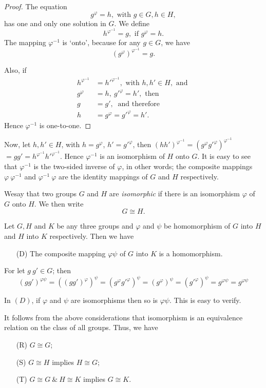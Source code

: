 \begin{proof}
  The equation
  $$
  g^\varphi = h, \text{ with } g \in  G, h \in  H,
  $$
  has one and only one solution in $G$. We define
  $$
  h^{\varphi^{-1}} = g, \text{ if } g^\varphi = h.
  $$
  The mapping $\varphi^{-1}$ is `onto', because for any $g \in 
  G$, we have  
  $$
  (g^\varphi)^{\varphi^{-1}} = g.
  $$

  Also, if
  \begin{align*}
    h^{\varphi^{-1}} & = h'^{\varphi^{-1}}, \text{ with } h, h'
    \in  H, \text{ and }\\ 
    g^\varphi & = h, ~ g'^\varphi = h', \text{ then } \\
    g & = g', ~\text{ and therefore } \\
    h & = g^\varphi = g'^\varphi = h'.
  \end{align*}
  Hence $\varphi^{-1}$ is one-to-one.
\end{proof}

Now, let $h, h' \in  H$, with $h = g^\varphi$, $h' =
g{'}^{\varphi}$, then $(hh')^{\varphi^{-1}} = (g^\varphi
g{'}^\varphi)^{\varphi^{-1}}$ $= gg' = h^{\varphi^{-1}}
h{'}^{\varphi^{-1}}$. Hence $\varphi^{-1}$ is an isomorphism of $H$
onto $G$. It is easy to see that $\varphi^{-1}$ is the two-sided
inverse of $\varphi$, in other words; the composite mappings $\varphi
~ \varphi^{-1}$ and $\varphi^{-1} ~ \varphi$ are the identity mappings
of $G$ and $H$ respectively. 

We\pageoriginale say that two groups $G$ and $H$ are \textit{isomorphic} if there is
an isomorphism $\varphi$ of $G$ onto $H$. We then write 
$$
G \cong H. 
$$

Let $G, H$ and $K$ be any three groups and $\varphi$ and $\psi$ be
homomorphism of $G$ into $H$ and $H$ into $K$ respectively. Then we
have  
\begin{enumerate}
\item[(D)] The composite mapping $\varphi \psi$ of $G$ into $K$ is a
  homomorphism.  
\end{enumerate}

For let $g ~ g' \in  G$; then
$$
(gg')^{\varphi \psi} = ((gg')^\varphi)^\psi = (g^\varphi g{'}^\varphi
)^\psi = (g^\varphi)^\psi = (g{'}^\varphi )^\psi = g^{\varphi \psi} =
g^{\varphi \psi} 
$$

In $(D)$, if $\varphi$ and $\psi$ are isomorphisms then so is $\varphi
\psi$. This is easy to verify. 

It follows from the above considerations that isomorphism is an
equivalence relation on the class of all groups. Thus, we have  
\begin{enumerate}
\item[(R)] $G \cong G$;
\item[(S)] $G \cong H$ implies $H \cong G$;
\item[(T)] $G \cong G ~ \& ~ H \cong K$ implies $G \cong K$.
\end{enumerate}

